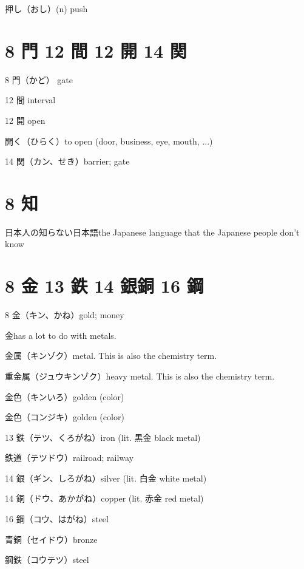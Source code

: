 押し（おし）(n) push

\section{8 門 12 間 12 開 14 関}

8 門（かど） gate

12 間 interval

12 開 open

開く（ひらく）to open (door, business, eye, mouth, ...)

14 関（カン、せき）barrier; gate

\section{8 知}

日本人の知らない日本語the Japanese language that the Japanese people don't know

\section{8 金 13 鉄 14 銀銅 16 鋼}

8 金（キン、かね）gold; money

金has a lot to do with metals.

金属（キンゾク）metal. This is also the chemistry term.

重金属（ジュウキンゾク）heavy metal. This is also the chemistry term.

金色（キンいろ）golden (color)

金色（コンジキ）golden (color)

13 鉄（テツ、くろがね）iron (lit. 黒金 black metal)

鉄道（テツドウ）railroad; railway

14 銀（ギン、しろがね）silver (lit. 白金 white metal)

14 銅（ドウ、あかがね）copper (lit. 赤金 red metal)

16 鋼（コウ、はがね）steel

青銅（セイドウ）bronze

鋼鉄（コウテツ）steel

